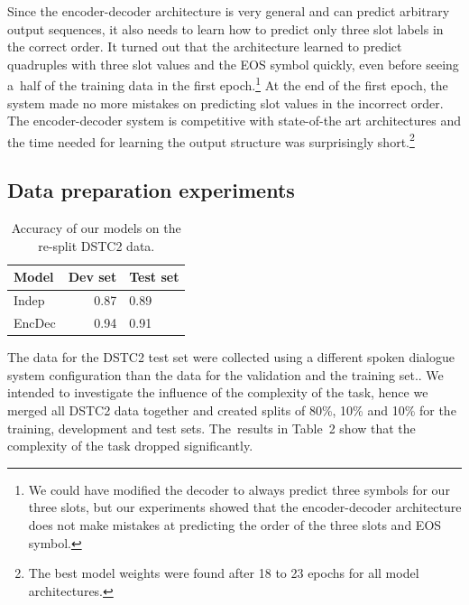 \documentclass{itatnew}
\begin{document}
Since the encoder-decoder architecture is very general and can predict arbitrary output sequences, it also needs to learn how to predict only three slot labels in the correct order.
It turned out that the architecture learned to predict quadruples with three slot values and the EOS symbol quickly, even before seeing a~half of the training data in the first epoch.\footnote{We could have modified the decoder to always predict three symbols for our three slots, but our experiments showed that the encoder-decoder architecture does not make mistakes at predicting the order of the three slots and EOS symbol.}  
At the end of the first epoch, the system made no more mistakes on predicting slot values in the incorrect order.
The encoder-decoder system is competitive with state-of-the art architectures and the time needed for learning the output structure was surprisingly short.\footnote{The best model weights were found after 18 to 23 epochs for all model architectures.}

\subsection{Data preparation experiments}
\label{sec:split}

\begin{table}
\vspace{-0.20em}
\begin{center}
\begin{tabular}{l@{\quad}rll}
\hline
\multicolumn{1}{l}{\rule{0pt}{12pt}
                   Model}&\multicolumn{1}{l}{Dev set}&\multicolumn{2}{l}{Test set}\\[2pt]
\hline\rule{0pt}{12pt}
Indep  &   0.87 & 0.89 \\
EncDec &   0.94 & 0.91 \\
\hline
\end{tabular}
\caption{Accuracy of our models on the re-split DSTC2 data.}
\vspace{-2em}
\end{center}
\label{tabsplit}
\end{table}

The data for the DSTC2 test set were collected using a different spoken dialogue system configuration than the data for the validation and the training set.\cite{henderson2014second}.
We intended to investigate the influence of the complexity of the task, hence we merged all DSTC2 data together and created splits of 80\%, 10\% and 10\% for the training, development and test sets.
The~results in Table~2 show that the complexity of the task dropped significantly.
\end{document}
